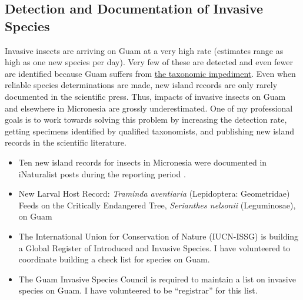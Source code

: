 \subsection{Detection and Documentation of Invasive Species}
\begin{refsection}

Invasive insects are arriving on Guam at a very high rate (estimates
range as high as one new species per day). Very few of these are detected
and even fewer are identified because Guam suffers from \href{https://en.wikipedia.org/wiki/Taxonomic_impediment}{the taxonomic impediment}.
Even when reliable species determinations are made, new island records
are only rarely documented in the scientific press. Thus, impacts
of invasive insects on Guam and elsewhere in Micronesia are grossly
underestimated. One of my professional goals is to work towards solving
this problem by increasing the detection rate, getting specimens identified
by qualified taxonomists, and publishing new island records in the
scientific literature.

\activities

\begin{itemize}
	
\item Ten new island records for insects in Micronesia were documented in iNaturalist posts during the reporting period \cite{inat36470788,inat36285968,inat35845152,inat32572967,inat31326484,inat29333274,inat18166461,inat16734728,inat15747194,inat15067449,inat13466275}.

\item New Larval Host Record: \textit{Traminda aventiaria} (Lepidoptera: Geometridae) Feeds on the Critically Endangered Tree, \textit{Serianthes nelsonii} (Leguminosae), on Guam~\cite{moore_new_2020}

\end{itemize}

\plans

\begin{itemize}

\item The International Union for Conservation of Nature (IUCN-ISSG) is
building a Global Register of Introduced and Invasive Species. I have
volunteered to coordinate building a check list for species on Guam.

\item The Guam Invasive Species Council is required to maintain a list on
invasive species on Guam. I have volunteered to be ``registrar''
for this list.

\end{itemize}

\printbibliography
\end{refsection}

